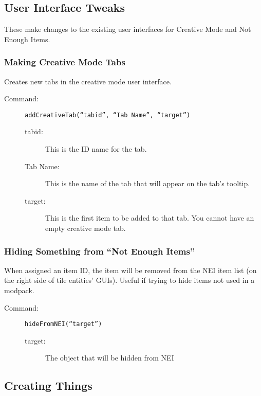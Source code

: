 \documentclass[letterpaper,titlepage,12pt]{article}
\begin{document}
\subsection{User Interface Tweaks}

These make changes to the existing user interfaces for Creative Mode and Not Enough Items.

\subsubsection{Making Creative Mode Tabs}

Creates new tabs in the creative mode user interface.

\begin{description}
\item[Command:] \texttt{addCreativeTab(``\emph{tabid}'', ``\emph{Tab Name}'', ``\emph{target}'')}

\begin{description}
\item [tabid:] This is the ID name for the tab.
\item [Tab Name:] This is the name of the tab that will appear on the tab's  tooltip.
\item [target:] This is the first item to be added to that tab.  You cannot have an empty creative mode tab.
\end{description}
\end{description}

\subsubsection{Hiding Something from ``Not Enough Items''}

When assigned an item ID, the item will be removed from the NEI item list (on the right side of tile entities' GUIs).  Useful if trying to hide items not used in a modpack.

\begin{description}
\item[Command:] \texttt{hideFromNEI(``\emph{target}'')}

\begin{description}
\item [target:] The object that will be hidden from NEI
\end{description}
\end{description}


\subsection{Creating Things}
\end{document}
